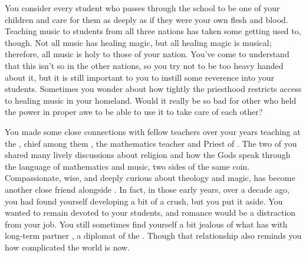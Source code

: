 \documentclass[char]{GL2020}
\begin{document}
You consider every student who passes through the school to be one of your children and care for them as deeply as if they were your own flesh and blood. Teaching music to students from all three nations has taken some getting used to, though. Not all music has healing magic, but all \pFarm{} healing magic is musical; therefore, all music is holy to those of your nation. You've come to understand that this isn't so in the other nations, so you try not to be too heavy handed about it, but it is still important to you to instill some reverence into your students. Sometimes you wonder about how tightly the priesthood restricts access to healing music in your homeland. Would it really be so bad for other \pFarmers{} who held the power in proper awe to be able to use it to take care of each other?

You made some close connections with fellow teachers over your years teaching at the \pSchool{}, chief among them \cFlowPriest{\full}, the mathematics teacher and Priest of \cFlow{}. The two of you shared many lively discussions about religion and how the Gods speak through the language of mathematics and music, two sides of the same coin. Compassionate, wise, and deeply curious about theology and magic, \cFlowPriest{} has become another close friend alongside \cBeetle{}. In fact, in those early years, over a decade ago, you had found yourself developing a bit of a crush, but you put it aside. You wanted to remain devoted to your students, and romance would be a distraction from your job. You still sometimes find yourself a bit jealous of what \cBeetle{} has with \cBeetle{\their} long-term partner \cJuniorStatesman{\full}, a diplomat of the \pShippies{}.  Though that relationship also reminds you how complicated the world is now.  
\end{document}

